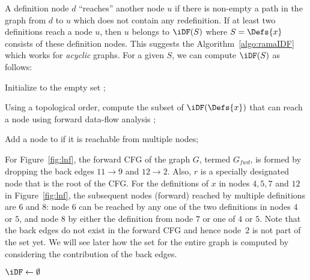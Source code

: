 {\medskip

A definition node $d$ ``reaches'' another node $u$ if there is non-empty a path in the graph from $d$ to $u$ which does not contain any redefinition. 
If at least two definitions reach a node $u$, then $u$ belongs to $\iDF(S)$ where $S=\Defs{x}$ consists of these definition nodes. 
This suggests the Algorithm~\ref{algo:ramaIDF} which works for \emph{acyclic} graphs. 
For a given $S$, we can compute $\iDF(S)$ as follows:
\begin{itemize}
\item { Initialize \iDF to the empty set };
\item { Using a topological order, compute the subset of $\iDF(\Defs{x})$ that can reach a node using forward data-flow analysis };
{\item} {Add a node to \iDF if it is reachable from multiple nodes};
\end{itemize}  

For Figure~\ref{fig:lnf}, the forward CFG of the graph $G$, termed $G_{\textit{fwd}}$, is formed by dropping the back edges $11 \rightarrow 9$ and $12 \rightarrow 2$. 
Also, $r$ is a specially designated node that is the root of the CFG. 
For the definitions of $x$ in nodes $4,5,7$ and $12$ in Figure~\ref{fig:lnf}, the subsequent nodes (forward) reached by multiple definitions are $6$ and $8$:  node $6$ can be reached by any one of the two definitions in nodes $4$ or $5$, and node $8$ by either the definition from node $7$ or one of $4$ or $5$. 
Note that the back edges do not exist in the forward CFG and hence node~$2$ is not part of the \iDF set yet. 
We will see later how the \iDF set for the entire graph is computed by considering the contribution of the back edges.

\begin{algorithm}
  \caption{%
  Algorithm for \iDF in an acyclic graph.}
  \label{algo:ramaIDF}

  $\iDF \gets \emptyset$\;
  \Return{$\iDF$}   
\end{algorithm}

}

